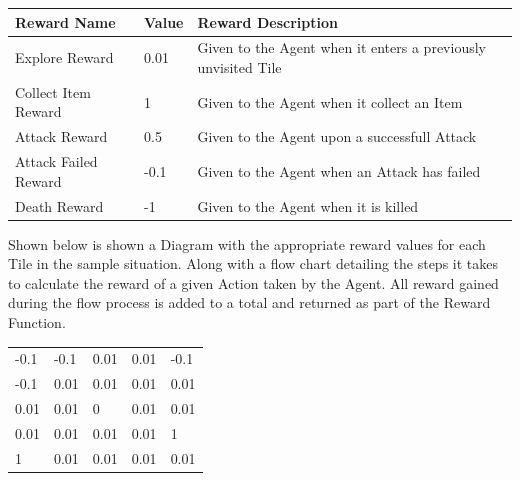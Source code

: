 \begin{flushleft}
            \vspace{0.2cm}
            \begin{center}
                \begin{tabular}{| L{2cm} | L{1cm} | L{8cm} |}
                    \hline
                    Reward Name & Value & Reward Description \\
                    \hline
                    Explore Reward & 0.01 & Given to the Agent when it enters a previously unvisited Tile  \\
                    \hline
                    Collect Item Reward & 1 & Given to the Agent when it collect an Item \\
                    \hline
                    Attack Reward & 0.5 & Given to the Agent upon a successfull Attack \\
                    \hline
                    Attack Failed Reward & -0.1 & Given to the Agent when an Attack has failed \\
                    \hline
                    Death Reward & -1 & Given to the Agent when it is killed \\
                    \hline
                \end{tabular}
            \end{center}
            \vspace{0.2cm}

            Shown below is shown a Diagram with the appropriate reward values for each Tile in the sample situation. Along with a flow chart 
            detailing the steps it takes to calculate the reward of a given Action taken by the Agent. All reward gained during the flow process is
            added to a total and returned as part of the Reward Function.

            \begin{center}
                \begin{tabular}{ C{1cm} C{1cm} C{1cm} C{1cm} C{1cm}}
                        \rule{0pt}{1.2cm}%
                        -0.1 & -0.1 & 0.01 & 0.01 & -0.1 \\
                        \rule{0pt}{1.2cm}%
                        -0.1 & 0.01 & 0.01 & 0.01 & 0.01 \\
                        \rule{0pt}{1.2cm}%
                        0.01 & 0.01 & 0 & 0.01 & 0.01 \\
                        \rule{0pt}{1.2cm}%
                        0.01 & 0.01 & 0.01 & 0.01 & 1 \\
                        \rule{0pt}{1.2cm}%
                        1  & 0.01 & 0.01 & 0.01 & 0.01 \\
                \end{tabular}


\end{center}
\end{flushleft}
